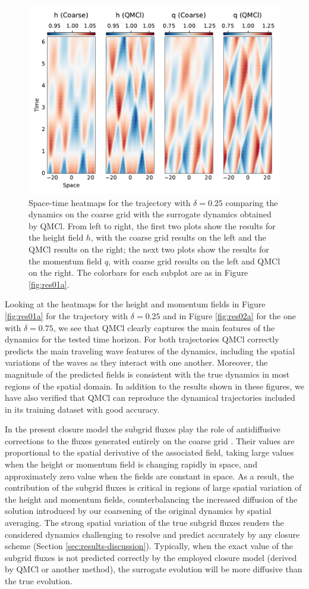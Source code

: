 \documentclass[letterpaper,10pt,3p,preprint]{elsarticle}
\begin{document}
\begin{figure}[t]
    \centering
    \includegraphics[width=.7\textwidth]{res01c.pdf}
    \caption{Space-time heatmaps for the trajectory with $\delta=0.25$
    comparing the dynamics on the coarse grid with the surrogate
    dynamics obtained by QMCl.
    From left to right, the first two plots show the results
    for the height field $h$, with the coarse grid results on the
    left and the QMCl results on the right;
    the next two plots show the results for the momentum field $q$,
    with coarse grid results on the left and QMCl on the right.
    The colorbars for each subplot are as in Figure \ref{fig:res01a}.}
    \label{fig:res01c}
\end{figure}

Looking at the heatmaps for the height and momentum fields in
Figure \ref{fig:res01a} for the trajectory with $\delta=0.25$
and in Figure \ref{fig:res02a} for the one with $\delta=0.75$,
we see that QMCl clearly captures the main features of the
dynamics for the tested time horizon.
For both trajectories QMCl correctly predicts the main
traveling wave features of the dynamics, including the spatial
variations of the waves as they interact with one another.
Moreover, the magnitude of the predicted fields is consistent
with the true dynamics in most regions of the spatial domain.
In addition to the results shown in these figures, we have
also verified that QMCl can reproduce the dynamical trajectories
included in its training dataset with good accuracy.

In the present closure model the subgrid fluxes play the role of
antidiffusive corrections to the fluxes generated entirely on the
coarse grid \cite{Timofeyev2025}.
Their values are proportional to the spatial derivative of the associated
field, taking large values when the height or momentum field is changing
rapidly in space, and approximately zero value when the fields are
constant in space.
As a result, the contribution of the subgrid fluxes is critical in regions
of large spatial variation of the height and momentum fields,
counterbalancing the increased diffusion of the solution introduced by our
coarsening of the original dynamics by spatial averaging.
The strong spatial variation of the true subgrid fluxes renders the
considered dynamics challenging to resolve and predict accurately
by any closure scheme
(Section \ref{sec:results-discussion}).
Typically, when the exact value of the subgrid fluxes is not
predicted correctly by the employed closure model
(derived by QMCl or another method),
the surrogate evolution will be more diffusive than the true
evolution.
\end{document}
